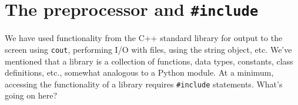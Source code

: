 \documentclass[12pt,letterpaper,twoside]{article}
\begin{document}













\section{\texorpdfstring{The preprocessor and \texttt{\#include}}{The preprocessor and \#include}}
We have used functionality from the C++ standard library for output to
the screen using \texttt{cout}, performing I/O with files, using the
string object, etc.
We've mentioned that a library is a collection of functions, data types, constants, class
definitions, etc., somewhat analogous to a Python module.
At a minimum, accessing the functionality of a library requires
\texttt{\#include} statements. What's going on here?
\end{document}

